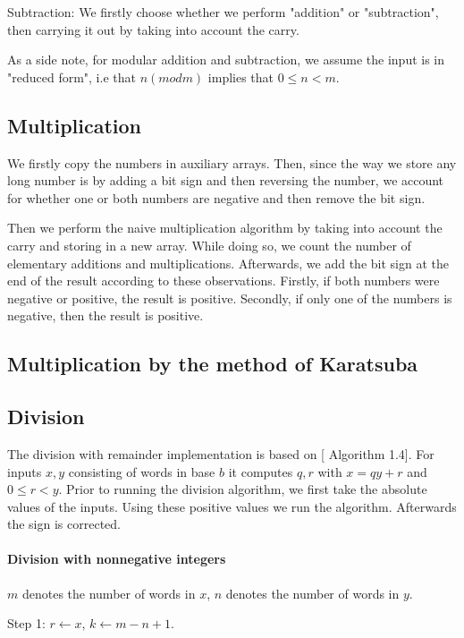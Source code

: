 \documentclass[a4paper]{article}
\begin{document}
Subtraction: We firstly choose whether we perform "addition"  or "subtraction", then carrying it out by taking into account the carry. 

As a side note, for modular addition and subtraction, we assume the input is in "reduced form", i.e that $n (mod m)$ implies that $0 \leq n < m.$


\subsection{Multiplication}

We firstly copy the numbers in auxiliary arrays. Then, since the way we store any long number is by adding a bit sign and then reversing the number, we account for whether one or both numbers are negative and then remove the bit sign. 

Then we perform the naive multiplication algorithm \cite{shoup} by taking into account the carry and storing in a new array. While doing so, we count the number of elementary additions and multiplications. Afterwards, we add the bit sign at the end of the result according to these observations. Firstly, if both numbers were negative or positive, the result is positive. Secondly, if only one of the numbers is negative, then the result is positive. 

\subsection{Multiplication by the method of Karatsuba}

\subsection{Division}

The division with remainder implementation is based on [\cite{ant} Algorithm 1.4].
For inputs $x, y$ consisting of words in base $b$ it computes $q, r$ with $x=qy+r$ and $0 \le r < y$.
Prior to running the division algorithm, we first take the absolute values of the inputs.
Using these positive values we run the algorithm.
Afterwards the sign is corrected.

\paragraph{Division with nonnegative integers}
$m$ denotes the number of words in $x$, $n$ denotes the number of words in $y$.

Step 1: $r \gets x$, $k \gets m - n + 1$.
\end{document}
